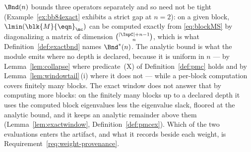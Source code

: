 
\begin{remark}\label{rem:notsharp}
$\Bnd(n)$ bounds three operators separately and so need not be tight
(Example~\ref{ex:bb84exact} exhibits a strict gap at $n=2$): on
a given block, $\lmin(\blk{M}{\eqn}_{\mc})$ can be computed exactly from
\eqref{eq:blockMS} by diagonalizing a matrix of dimension
$\binom{|\InpC|+n-1}{n}$, which is what Definition~\ref{def:exactbnd} names
$\Bnd^{\ast}(n)$. The analytic bound is what the module emits where no depth
is declared, because it is uniform in $n$ --- by Lemma~\ref{lem:collapse}
where predicate~(X) of Definition~\ref{def:pmc} holds and by
Lemma~\ref{lem:windowtail}\,(i) where it does not --- while a per-block
computation covers finitely many blocks. The exact window does not answer
that by computing more blocks: on the finitely many blocks up to a declared
depth it uses the computed block eigenvalues less the eigenvalue slack,
floored at the analytic bound, and it keeps an analytic remainder above them
(Lemma~\ref{lem:exactwindow}, Definition~\ref{def:pmcex}). Which of the two
evaluations enters the artifact, and what it records beside each weight, is
Requirement~\ref{req:weight-provenance}.
\end{remark}
